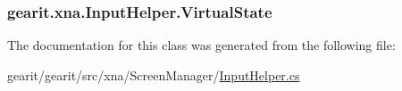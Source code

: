 \hypertarget{classgearit_1_1xna_1_1_input_helper_a63451a9d8dddccb85b29a0df75ba0549}{
\subsubsection[{Virtual\+State}]{ gearit.\+xna.\+Input\+Helper.\+Virtual\+State\hspace{0.3cm}{\ttfamily [get]}}}\label{classgearit_1_1xna_1_1_input_helper_a63451a9d8dddccb85b29a0df75ba0549}


The documentation for this class was generated from the following file\+:\begin{DoxyCompactItemize}
\item 
gearit/gearit/src/xna/\+Screen\+Manager/\hyperlink{_input_helper_8cs}{Input\+Helper.\+cs}\end{DoxyCompactItemize}
